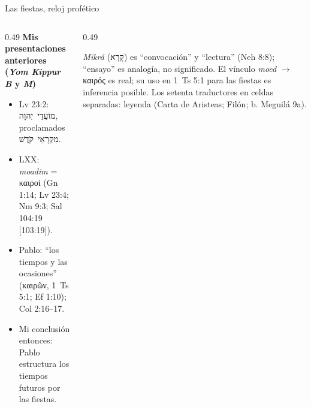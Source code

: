 \documentclass[hyperref={bookmarks=false},aspectratio=169]{beamer}
\newcommand{\heb}[1]{\mbox{\foreignlanguage{hebrew}{#1}}}
\newcommand{\grc}[1]{\foreignlanguage{ancientgreek}{#1}}
\newcommand{\destacar}[1]{\textbf{\textcolor{tierraroja}{#1}}}
\begin{document}
\begin{frame}{Las fiestas, reloj profético}
\begin{columns}[t,onlytextwidth]
\begin{column}{0.49\textwidth}\scriptsize
\destacar{Mis presentaciones anteriores (\emph{Yom Kippur B} y \emph{M})}
\begin{itemize}
\item Lv 23:2: \heb{מוֹעֲדֵי יְהוָה}, proclamados \heb{מִקְרָאֵי קֹדֶשׁ}.
\item LXX: \emph{moadim} = \grc{καιροί} (Gn 1:14; Lv 23:4; Nm 9:3; Sal 104:19 [103:19]).
\item Pablo: ``los tiempos y las ocasiones'' (\grc{καιρῶν}, 1~Ts 5:1; Ef 1:10); Col 2:16--17.
\item Mi conclusión entonces: Pablo estructura los tiempos futuros por las fiestas.
\end{itemize}
\end{column}
\begin{column}{0.49\textwidth}
\begin{tcolorbox}[colback=mostaza!12,colframe=mostaza!80!tierraroja,boxrule=0.6pt,arc=2pt,fontupper=\scriptsize,title={\scriptsize Precisión},coltitle=caferojizo,colbacktitle=mostaza!35]
\emph{Mikrá} (\heb{קָרָא}) es ``convocación'' y ``lectura'' (Neh 8:8); ``ensayo'' es analogía, no significado. El vínculo \emph{moed} $\rightarrow$ \grc{καιρός} es real; su uso en 1~Ts 5:1 para las fiestas es inferencia posible. Los setenta traductores en celdas separadas: leyenda (Carta de Aristeas; Filón; b. Meguilá 9a).
\end{tcolorbox}
\end{column}
\end{columns}
\end{frame}
\end{document}
